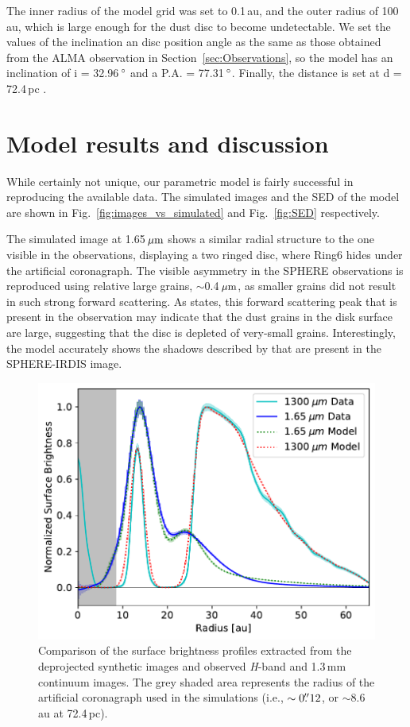 \documentclass[letters,usenatbib,times]{mnras}
\begin{document}
The inner radius of the model grid was set to 0.1\,au,  and the outer radius of 100\,au, which is large enough for the dust disc to become undetectable. We set the values of the inclination an disc  position angle as the same as those obtained from the ALMA observation in Section~\ref{sec:Observations}, so the model has an inclination of i = 32.96\,$\hbox{$^\circ$}$ and a P.A. = 77.31\,$\hbox{$^\circ$}$. Finally, the distance is set at d = 72.4\,pc \citep{Gaia}.

\section{Model results and discussion} \label{sec:results}

While certainly not unique, our parametric model is fairly successful in reproducing the available data. The simulated images and the SED of the model are shown in Fig.~\ref{fig:images_vs_simulated} and Fig.~\ref{fig:SED} respectively.

The simulated image at 1.65\,$\hbox{$\mu$m}$ shows a similar radial structure to the one visible in the observations, displaying a two ringed disc, where Ring6 hides under the artificial coronagraph. The visible asymmetry in the SPHERE observations is reproduced using relative large grains, $\sim$0.4\,$\hbox{$\mu$m}$, as smaller grains did not result in such strong forward scattering. As \citet{refId0} states, this forward scattering peak that is present in the observation may indicate that the dust grains in the disk surface are large, suggesting that the disc is depleted of very-small grains. Interestingly, the model accurately shows the shadows described by \citet{dOrazi} that are present in the SPHERE-IRDIS image.  

\begin{figure}
	\includegraphics[width=\columnwidth]{comp_fig_all_profiles_au.pdf}
    \caption{Comparison of the surface brightness profiles extracted from the deprojected synthetic images and observed \textit{H}-band and 1.3\,mm continuum images. The grey shaded area represents the radius of the artificial coronagraph used in the simulations (i.e., $\sim0\hbox{$.\!\!^{\prime\prime}$} 12$, or $\sim$8.6\,au at 72.4\,pc).}
    \label{fig:radprofiles}
\end{figure}
\end{document}
